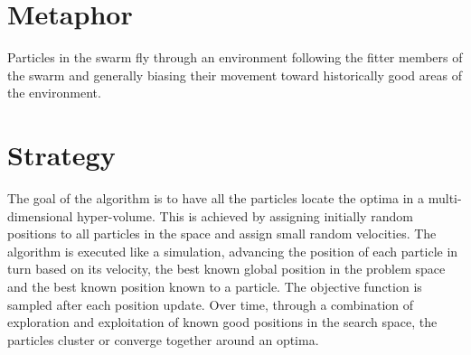 \documentclass[a4paper, 11pt]{article}
\begin{document}
\section{Metaphor}
\label{sec:metaphor}
Particles in the swarm fly through an environment following the fitter members of the swarm and generally biasing their movement toward historically good areas of the environment.


\section{Strategy}
\label{sec:strategy}
The goal of the algorithm is to have all the particles locate the optima in a multi-dimensional hyper-volume.
This is achieved by assigning initially random positions to all particles in the space and assign small random velocities. The algorithm is executed like a simulation, advancing the position of each particle in turn based on its velocity, the best known global position in the problem space and the best known position known to a particle. The objective function is sampled after each position update. Over time, through a combination of exploration and exploitation of known good positions in the search space, the particles cluster or converge together around an optima. 

\end{document}
